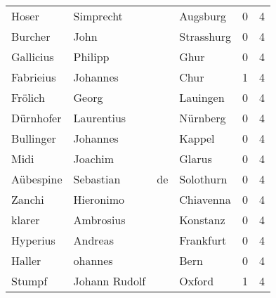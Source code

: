 \begin{tabular}{llllrr}
                    Hoser &                          Simprecht &             &                                    Augsburg &          0 &         4 \\
                  Burcher &                               John &             &                                  Strasshurg &          0 &         4 \\
                Gallicius &                            Philipp &             &                                        Ghur &          0 &         4 \\
                Fabrieius &                           Johannes &             &                                        Chur &          1 &         4 \\
                  Frölich &                              Georg &             &                                    Lauingen &          0 &         4 \\
                Dürnhofer &                         Laurentius &             &                                    Nürnberg &          0 &         4 \\
                Bullinger &                           Johannes &             &                                      Kappel &          0 &         4 \\
                     Midi &                            Joachim &             &                                      Glarus &          0 &         4 \\
                Aübespine &                          Sebastian &          de &                                   Solothurn &          0 &         4 \\
                   Zanchi &                          Hieronimo &             &                                   Chiavenna &          0 &         4 \\
                   klarer &                          Ambrosius &             &                                    Konstanz &          0 &         4 \\
                 Hyperius &                            Andreas &             &                                   Frankfurt &          0 &         4 \\
                   Haller &                            ohannes &             &                                        Bern &          0 &         4 \\
                   Stumpf &                      Johann Rudolf &             &                                      Oxford &          1 &         4 \\

\end{tabular}
